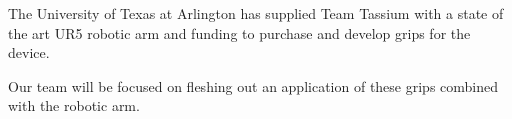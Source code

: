 The University of Texas at Arlington has supplied Team Tassium with a state of the art UR5 robotic arm and funding to purchase and develop grips for the device.

Our team will be focused on fleshing out an application of these grips combined with the robotic arm.